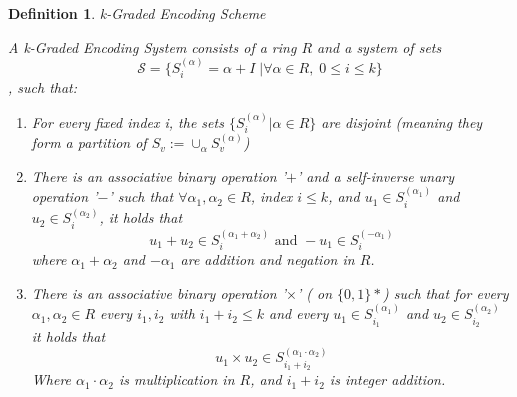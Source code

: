 \documentclass[12pt,twoside]{reedthesis}
\newtheorem{definition}{Definition}
\begin{document}
    \begin{definition}{k-Graded Encoding Scheme}
    \par A k-Graded Encoding System consists of a ring $R$ and a system of sets $$\mathcal{S}= \{S_i^{(\alpha)} = \alpha + I \; | \forall \alpha \in R, \; 0 \leq i \leq k \}$$, such that:
    \begin{enumerate}
    \item For every fixed index i, the sets $\{S_i^{(\alpha)}| \alpha \in R \}$ are disjoint (meaning they form a partition of $S_v := \cup_\alpha S_v^{(\alpha)}$)
    
    \item There is an associative binary operation '$ + $' and a self-inverse unary operation '$-$' such that $\forall \alpha_1,\alpha_2 \in R$, index $i\leq k$, and $u_1 \in S_i^{(\alpha_1)}$ and $u_2 \in S_i^{(\alpha_2)}$, it holds that 
    $$u_1 + u_2 \in S_i^{(\alpha_1 + \alpha_2)} \text{ and } -u_1 \in S_i^{(-\alpha_1)}$$
    where $\alpha_1 + \alpha_2$ and $-\alpha_1$ are addition and negation in $R$.
    
    \item There is an associative binary operation '$\times$' ( on $\{ 0,1 \}*$) such that for every $\alpha_1,\alpha_2 \in R$ every $i_1,i_2$ with $i_1+i_2 \leq k$ and every $u_1 \in S_{i_1}^{(\alpha_1)}$ and $u_2 \in S_{i_2}^{(\alpha_2)}$ it holds that 
    $$u_1 \times u_2 \in S_{i_1 + i_2}^{(\alpha_1 \cdot \alpha_2)} $$
    Where $\alpha_1 \cdot \alpha_2$ is multiplication in $R$, and $i_1 + i_2$ is integer addition.
    \end{enumerate}
    \end{definition}

    
 
  
    
     
         
    
\end{document}
